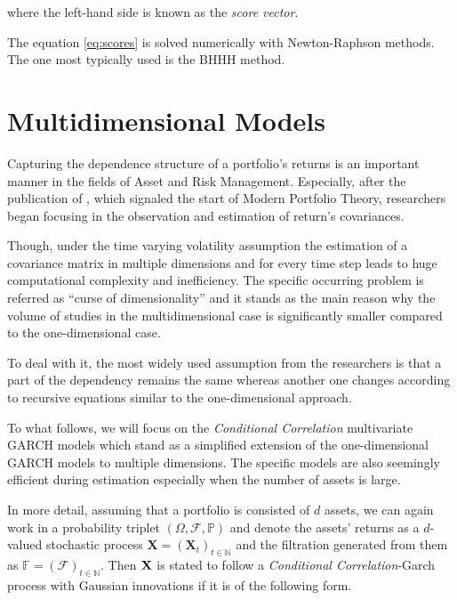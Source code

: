 \documentclass[a4paper, oneside]{discothesis}
\begin{document}
where the left-hand side is known as the \textit{score vector}.  

The equation \ref{eq:scores} is solved numerically with Newton-Raphson methods. The one most typically used is the BHHH \cite{bhhh} method.

\section{Multidimensional Models}

Capturing the dependence structure of a portfolio's returns is an important manner in the fields of Asset and Risk Management. Especially, after the publication of \cite{MPT}, which signaled the start of Modern Portfolio Theory, researchers began focusing in the observation and estimation of return's covariances. 

Though, under the time varying volatility assumption the estimation of a covariance matrix in multiple dimensions and for every time step leads to huge computational complexity and inefficiency. The specific occurring problem is referred as ``curse of dimensionality'' and it stands as the main reason why the volume of studies in the multidimensional case is significantly smaller compared to the one-dimensional case.

To deal with it, the most widely used assumption from the researchers is that a part of the dependency remains the same whereas another one changes according to recursive equations similar to the one-dimensional approach.

To what follows, we will focus on the \textit{Conditional Correlation} multivariate GARCH models which stand as a simplified extension of the one-dimensional GARCH models to multiple dimensions. The specific models are also seemingly efficient during estimation especially when the number of assets is large.

In more detail, assuming that a portfolio is consisted of $d$ assets, we can again work in a probability triplet $(\Omega, \mathcal{F}, \mathbb{P})$ and denote the assets' returns as a $d$-valued stochastic process $\mathbf{X} = (\mathbf{X}_t)_{t\in\mathbb{N}}$ and the filtration generated from them as $\mathbb{F} = (\mathcal{F})_{t\in\mathbb{N}}$. Then $\bf{X}$ is stated to follow a \textit{Conditional Correlation}-Garch process with Gaussian innovations if it is of the following form.
\end{document}
